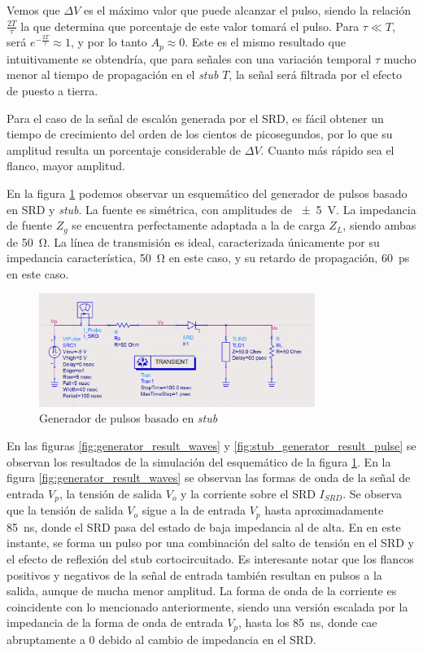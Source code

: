 Vemos que $\Delta V$ es el máximo valor que puede alcanzar el pulso, siendo la
relación $\frac{2T}{\tau}$ la que determina que porcentaje de este valor tomará
el pulso. Para $ \tau \ll T $, será $e^{-\frac{2T}{\tau}} \approx 1$, y por lo
tanto $A_p \approx 0$. Este es el mismo resultado que intuitivamente se
obtendría, que para señales con una variación temporal $\tau$ mucho menor al
tiempo de propagación en el \textit{stub} $T$, la señal será filtrada por el
efecto de puesto a tierra.

Para el caso de la señal de escalón generada por el SRD, es fácil obtener un
tiempo de crecimiento del orden de los cientos de picosegundos, por lo que su
amplitud resulta un porcentaje considerable de $\Delta V$. Cuanto más rápido sea
el flanco, mayor amplitud.

En la figura \ref{fig:stub_generator_circuit} podemos observar un esquemático
del generador de pulsos basado en SRD y \textit{stub}. La fuente es simétrica,
con amplitudes de \qty{\pm 5}{\volt}. La impedancia de fuente $Z_g$ se encuentra
perfectamente adaptada a la de carga $Z_L$, siendo ambas de \qty{50}{\ohm}. La
línea de transmisión es ideal, caracterizada únicamente por su impedancia
característica, \qty{50}{\ohm} en este caso, y su retardo de propagación,
\qty{60}{\pico\second} en este caso.

\begin{figure}[tbp]
    \centering
    \includegraphics[width=0.8\textwidth]{images/stub_generator_circuit.png}
    \caption{Generador de pulsos basado en \textit{stub}}
    \label{fig:stub_generator_circuit}
\end{figure}

En las figuras \ref{fig:generator_result_waves} y
\ref{fig:stub_generator_result_pulse} se observan los resultados de la
simulación del esquemático de la figura \ref{fig:stub_generator_circuit}. En la
figura \ref{fig:generator_result_waves} se observan las formas de onda de la
señal de entrada $V_p$, la tensión de salida $V_o$ y la corriente sobre el SRD
$I_{SRD}$. Se observa que la tensión de salida $V_o$ sigue a la de entrada $V_p$
hasta aproximadamente \qty{85}{\nano\second}, donde el SRD pasa del estado de
baja impedancia al de alta. En en este instante, se forma un pulso por una
combinación del salto de tensión en el SRD y el efecto de reflexión del stub
cortocircuitado. Es interesante notar que los flancos positivos y negativos de
la señal de entrada también resultan en pulsos a la salida, aunque de mucha
menor amplitud. La forma de onda de la corriente es coincidente con lo
mencionado anteriormente, siendo una versión escalada por la impedancia de la
forma de onda de entrada $V_p$, hasta los \qty{85}{\nano\second}, donde cae
abruptamente a $0$ debido al cambio de impedancia en el SRD.

